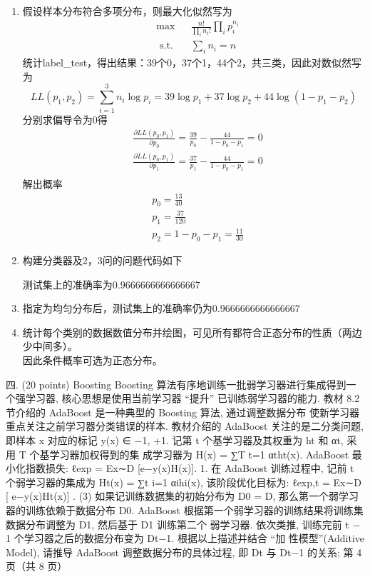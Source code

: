 \documentclass[answers]{exam}  %
\begin{document}
\begin{questions}
\begin{solution}
\begin{enumerate}
	\item 假设样本分布符合多项分布，则最大化似然写为
	\[ 
		\begin{aligned}
			&\max&&\frac{n!}{\prod_{i} n_i!}\prod_{i} p_i^{n_i}\\
			&\text{ s.t.}&&\sum_{i}n_i=n
		\end{aligned}
	\]
	统计label\_test，得出结果：39个0，37个1，44个2，共三类，因此对数似然写为
	\[LL(p_1,p_2)=\sum^3_{i=1}n_i\log p_i=39\log p_1+37\log p_2+44\log(1-p_1-p_2) \]
	分别求偏导令为0得
	\[
		\begin{aligned}
			&\frac{\partial LL(p_0,p_1)}{\partial p_0}=\frac{39}{p_0}-\frac{44}{1-p_0-p_1}=0\\
			&\frac{\partial LL(p_0,p_1)}{\partial p_1}=\frac{37}{p_1}-\frac{44}{1-p_0-p_1}=0\\
		\end{aligned}
	\]
	解出概率
	\[
		\begin{aligned}
			&p_0=\frac{13}{40}\\
			&p_1=\frac{37}{120}\\
			&p_2=1-p_0-p_1=\frac{11}{30}
		\end{aligned}	
	\]
	\item 构建分类器及2，3问的问题代码如下
	
	测试集上的准确率为0.9666666666666667
	\item 指定为均匀分布后，测试集上的准确率仍为0.9666666666666667
	\item 统计每个类别的数据数值分布并绘图，可见所有都符合正态分布的性质（两边少中间多）。\\
	因此条件概率可选为正态分布。
\end{enumerate}
\end{solution}
四. (20 points) Boosting
Boosting 算法有序地训练一批弱学习器进行集成得到一个强学习器, 核心思想是使用当前学习器 “提升”
已训练弱学习器的能力. 教材 8.2 节介绍的 AdaBoost 是一种典型的 Boosting 算法, 通过调整数据分布
使新学习器重点关注之前学习器分类错误的样本. 教材介绍的 AdaBoost 关注的是二分类问题, 即样本 x
对应的标记 y(x) ∈ {−1, +1}. 记第 t 个基学习器及其权重为 ht 和 αt, 采用 T 个基学习器加权得到的集
成学习器为 H(x) = ∑T
t=1 αtht(x). AdaBoost 最小化指数损失: ℓexp = Ex∼D
[e−y(x)H(x)].
1. 在 AdaBoost 训练过程中, 记前 t 个弱学习器的集成为 Ht(x) = ∑t
i=1 αihi(x), 该阶段优化目标为:
ℓexp,t = Ex∼D
[
e−y(x)Ht(x)]
. (3)
如果记训练数据集的初始分布为 D0 = D, 那么第一个弱学习器的训练依赖于数据分布 D0.
AdaBoost 根据第一个弱学习器的训练结果将训练集数据分布调整为 D1, 然后基于 D1 训练第二个
弱学习器. 依次类推, 训练完前 t − 1 个学习器之后的数据分布变为 Dt−1. 根据以上描述并结合 “加
性模型”(Additive Model), 请推导 AdaBoost 调整数据分布的具体过程, 即 Dt 与 Dt−1 的关系;
第 4 页（共 8 页）


\end{questions}
\end{document}
